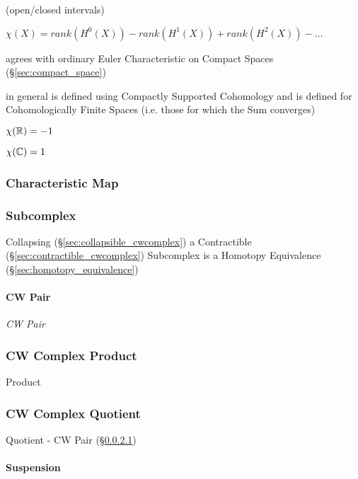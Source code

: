 (open/closed intervals) %

$\chi(X) = rank (H^0(X)) - rank (H^1(X)) + rank (H^2(X)) - \ldots$

agrees with ordinary Euler Characteristic on Compact Spaces
(\S\ref{sec:compact_space})

in general is defined using Compactly Supported Cohomology and is
defined for Cohomologically Finite Spaces (i.e. those for which the
Sum converges) %

$\chi(\mathbb{R}) = -1$

$\chi(\mathbb{C}) = 1$



\subsubsection{Characteristic Map}\label{sec:characteristic_map}

\subsubsection{Subcomplex}\label{sec:subcomplex}

Collapsing (\S\ref{sec:collapsible_cwcomplex}) a Contractible
(\S\ref{sec:contractible_cwcomplex}) Subcomplex is a Homotopy
Equivalence (\S\ref{sec:homotopy_equivalence})



\paragraph{CW Pair}\label{sec:cw_pair}\hfill

\emph{CW Pair}



\subsubsection{CW Complex Product}\label{sec:cwcomplex_product}

Product



\subsubsection{CW Complex Quotient}\label{sec:cwcomplex_quotient}

Quotient - CW Pair (\S\ref{sec:cw_pair})



\paragraph{Suspension}\label{sec:suspension}\hfill


